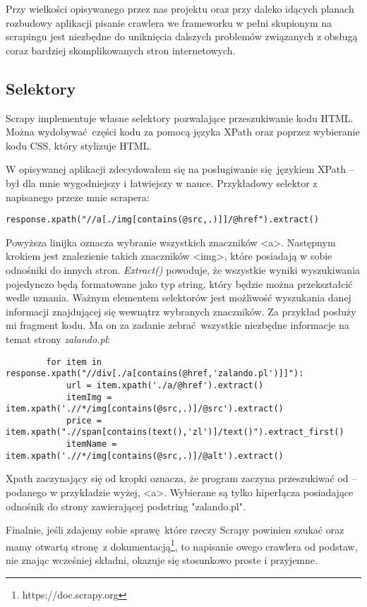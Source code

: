 Przy wielkości opisywanego przez nas projektu oraz przy daleko idących planach rozbudowy aplikacji pisanie crawlera we frameworku w pełni skupionym na scrapingu jest niezbędne do uniknięcia dalszych problemów związanych z obsługą coraz bardziej skomplikowanych stron internetowych.
\subsection{Selektory}

Scrapy implementuje własne selektory pozwalające przeszukiwanie kodu HTML.
Można wydobywać części kodu za pomocą języka XPath oraz poprzez wybieranie kodu CSS, który stylizuje HTML.

W opisywanej aplikacji zdecydowałem się na posługiwanie się językiem XPath -- był dla mnie wygodniejszy i łatwiejszy w nauce.
Przykładowy selektor z napisanego przeze mnie scrapera:
\begin{lstlisting}
response.xpath("//a[./img[contains(@src,.)]]/@href").extract()
\end{lstlisting}
Powyższa linijka oznacza wybranie wszystkich znaczników \textless a\textgreater. Następnym krokiem jest znalezienie takich znaczników \textless img\textgreater, które posiadają w sobie odnośniki do innych stron. 
\emph{Extract()} powoduje, że wszystkie wyniki wyszukiwania pojedynczo będą formatowane jako typ string, który będzie można przekształcić wedle uznania.
Ważnym elementem selektorów jest możliwość wyszukania danej informacji znajdującej się wewnątrz wybranych znaczników.
Za przykład posłuży mi fragment kodu. Ma on za zadanie zebrać wszystkie niezbędne informacje na temat strony \emph{zalando.pl}:
\begin{lstlisting}
        for item in response.xpath("//div[./a[contains(@href,'zalando.pl')]]"):
            url = item.xpath('./a/@href').extract()
            itemImg = item.xpath('.//*/img[contains(@src,.)]/@src').extract()
            price = item.xpath(".//span[contains(text(),'zl')]/text()").extract_first()
            itemName = item.xpath('.//*/img[contains(@src,.)]/@alt').extract()
\end{lstlisting}

Xpath zaczynający się od kropki oznacza, że program zaczyna przeszukiwać od -- podanego w przykładzie wyżej, \textless a\textgreater. Wybierane są tylko hiperłącza posiadające odnośnik do strony zawierającej podstring "zalando.pl".

Finalnie, jeśli zdajemy sobie sprawę które rzeczy Scrapy powinien szukać oraz mamy otwartą stronę z dokumentacją\footnote{https://doc.scrapy.org}, to napisanie owego crawlera od podstaw, nie znając wcześniej składni, okazuje się stosunkowo proste i przyjemne.

